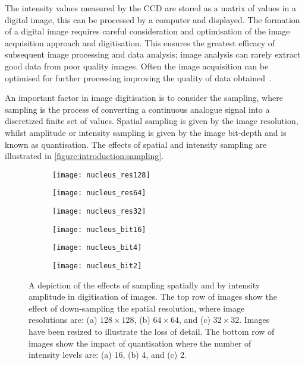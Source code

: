 The intensity values measured by the CCD are stored as a matrix of values in a digital image, this can be processed by a computer and displayed. The formation of a digital image requires careful consideration and optimisation of the image acquisition approach and digitisation. This ensures the greatest efficacy of subsequent image processing and data analysis; image analysis can rarely extract good data from poor quality images. Often the image acquisition can be optimised for further processing improving the quality of data obtained~\cite{Roeder2012}.

An important factor in image digitisation is to consider the sampling, where sampling is the process of converting a continuous analogue signal into a discretized finite set of values. Spatial sampling is given by the image resolution, whilst amplitude or intensity sampling is given by the image bit-depth and is known as quantisation. The effects of spatial and intensity sampling are illustrated in \autoref{figure:introduction:sampling}.

\begin{figure}[htbp!]\centering
	\begin{subfigure}[b]{0.32\linewidth}
		\centering
		\texttt{[image: nucleus\_res128]}
		\caption{}
		\label{figure:introduction:sampling:res128}
	\end{subfigure}
	\begin{subfigure}[b]{0.32\linewidth}
		\centering
		\texttt{[image: nucleus\_res64]}
		\caption{}
		\label{figure:introduction:sampling:res64}
	\end{subfigure}
	\begin{subfigure}[b]{0.32\linewidth}
		\centering
		\texttt{[image: nucleus\_res32]}
		\caption{}
		\label{figure:introduction:sampling:res32}
	\end{subfigure}
	\begin{subfigure}[b]{0.32\linewidth}
		\centering
		\texttt{[image: nucleus\_bit16]}
		\caption{}
		\label{figure:introduction:sampling:bit16}
	\end{subfigure}
	\begin{subfigure}[b]{0.32\linewidth}
		\centering
		\texttt{[image: nucleus\_bit4]}
		\caption{}
		\label{figure:introduction:sampling:bit4}
	\end{subfigure}
	\begin{subfigure}[b]{0.32\linewidth}
		\centering
		\texttt{[image: nucleus\_bit2]}
		\caption{}
		\label{figure:introduction:sampling:bit2}
	\end{subfigure}
\caption[Sampling in digitisation]{A depiction of the effects of sampling spatially and by intensity amplitude in digitisation of images. The top row of images show the effect of down-sampling the spatial resolution, where image resolutions are: (a) $128 \times 128$, (b) $64 \times 64$, and (c) $32 \times 32$. Images have been resized to illustrate the loss of detail. The bottom row of images show the impact of quantisation where the number of intensity levels are: (a) 16, (b) 4, and (c) 2.}
\label{figure:introduction:sampling}
\end{figure}

